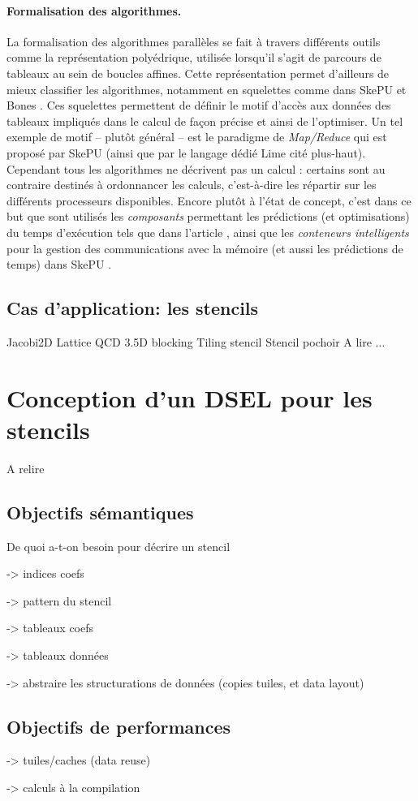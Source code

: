 \paragraph{Formalisation des algorithmes.}
La formalisation des algorithmes parallèles se fait à travers différents outils comme la représentation polyédrique, utilisée lorsqu'il s'agit de parcours de tableaux au sein de boucles affines. Cette représentation permet d'ailleurs de mieux classifier les algorithmes, notamment en squelettes comme dans \textsf{SkePU} et \textsf{Bones} \cite{Art4,Art3,Art9}. Ces squelettes permettent de définir le motif d'accès aux données des tableaux impliqués dans le calcul de façon précise et ainsi de l'optimiser. Un tel exemple de motif -- plutôt général -- est le paradigme de \emph{Map/Reduce} qui est proposé par \textsf{SkePU} (ainsi que par le langage dédié \textsf{Lime} cité plus-haut). Cependant tous les algorithmes ne décrivent pas un calcul : certains sont au contraire destinés à ordonnancer les calculs, c'est-à-dire les répartir sur les différents processeurs disponibles. Encore plutôt à l'état de concept, c'est dans ce but que sont utilisés les \emph{composants} permettant les prédictions (et optimisations) du temps d'exécution tels que dans l'article \cite{Art7}, ainsi que les \emph{conteneurs intelligents} pour la gestion des communications avec la mémoire (et aussi les prédictions de temps) dans \textsf{SkePU} \cite[p.~78]{Ths1}.

\subsection{Cas d'application: les stencils}

Jacobi2D
Lattice QCD \cite{Art1}
3.5D blocking \cite{Art11}
Tiling stencil \cite{Art16}
Stencil pochoir \cite{Art18}
A lire ... \cite{Art19}

\section{Conception d'un DSEL pour les stencils}

A relire \cite{Art22}

\subsection{Objectifs sémantiques}

De quoi a-t-on besoin pour décrire un stencil

-> indices coefs

-> pattern du stencil

-> tableaux coefs

-> tableaux données

-> abstraire les structurations de données (copies tuiles, et data layout)

\subsection{Objectifs de performances}

-> tuiles/caches (data reuse)

-> calculs à la compilation

